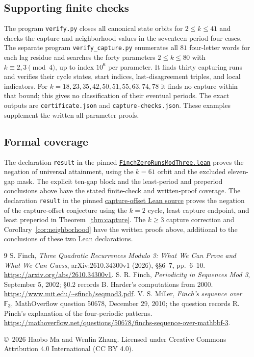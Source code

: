 \documentclass[11pt]{article}
\begin{document}
\subsection*{Supporting finite checks}
The program \texttt{verify.py} closes all canonical state orbits for
$2\le k\le41$ and checks the capture and neighborhood values in
the seventeen period-four cases. The separate program
\texttt{verify\_capture.py} enumerates all $81$ four-letter words
for each lag residue and searches the forty parameters
$2\le k\le80$ with $k\equiv2,3\pmod4$, up to index $10^6$
per parameter. It finds thirty capturing runs and verifies their
cycle states, start indices, last-disagreement triples, and local
indicators. For $k=18,23,35,42,50,51,55,63,74,78$ it finds no
capture within that bound; this gives no classification of their
eventual periods. The exact outputs are \texttt{certificate.json}
and \texttt{capture-checks.json}. These examples supplement the
written all-parameter proofs.

\newpage
\subsection*{Formal coverage}
The declaration \texttt{result} in the pinned
\href{https://github.com/the-omega-institute/trureturing/blob/0d064f0d28d301cd8a1d1b09173035a9f2fd6c02/D5/S1/Recurrence/FinchZeroRunsModThree.lean}{\texttt{FinchZeroRunsModThree.lean}}
proves the negation of universal attainment, using the $k=61$
orbit and the excluded eleven-gap mask. The explicit ten-gap block
and the least-period and preperiod conclusions above have the stated
finite-check and written-proof coverage.
The declaration \texttt{result} in the pinned
\href{https://github.com/the-omega-institute/trureturing/blob/0d064f0d28d301cd8a1d1b09173035a9f2fd6c02/D5/S0/Certificates/FinchConjecture23CaptureOffsetRefutation.lean}{capture-offset Lean source}
proves the negation of the capture-offset conjecture using the $k=2$
cycle, least capture endpoint, and least preperiod in
Theorem~\ref{thm:capture}. The $k\ge3$ capture correction and
Corollary~\ref{cor:neighborhood} have the written proofs above,
additional to the conclusions of these two Lean declarations.

\begin{thebibliography}{9}
 S. Finch,
\emph{Three Quadratic Recurrences Modulo 3: What We Can Prove and What We Can Guess},
arXiv:2610.34300v1 (2026), \S\S6--7, pp.~6--10.
\url{https://arxiv.org/abs/2610.34300v1}.
 S. R. Finch,
\emph{Periodicity in Sequences Mod 3}, September 5, 2002;
\S0.2 records B. Harder's computations from 2000.
\url{https://www.mit.edu/~sfinch/seqmod3.pdf}.
 V. S. Miller,
\emph{Finch's sequence over $\mathbb F_3$},
MathOverflow question 50678, December 29, 2010; the question records
R. Pinch's explanation of the four-periodic patterns.
\url{https://mathoverflow.net/questions/50678/finchs-sequence-over-mathbbf-3}.
\end{thebibliography}
\bigskip
\noindent\small\copyright\ 2026 Haobo Ma and Wenlin Zhang.
Licensed under Creative Commons Attribution 4.0
International (CC BY 4.0).
\end{document}
